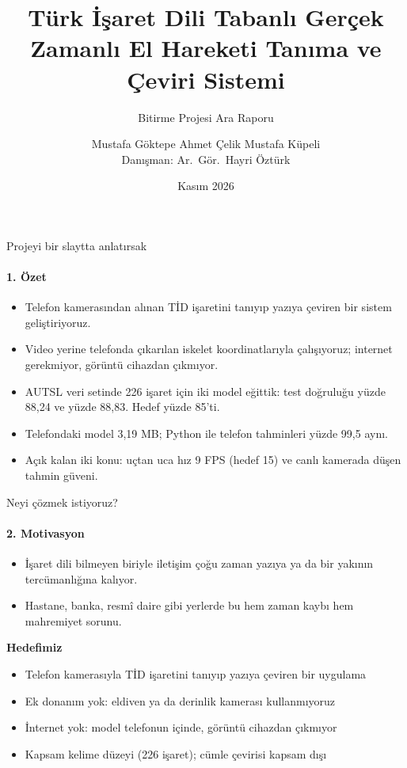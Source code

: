 \documentclass[aspectratio=169,11pt]{beamer}
\title{Türk İşaret Dili Tabanlı Gerçek Zamanlı El Hareketi Tanıma ve Çeviri Sistemi}
\subtitle{Bitirme Projesi Ara Raporu}
\author{Mustafa Göktepe \quad Ahmet Çelik \quad Mustafa Küpeli \\[1mm] {\small Danışman: Ar.\ Gör.\ Hayri Öztürk}}
\institute{Erciyes Üniversitesi, Bilgisayar Mühendisliği}
\date{Kasım 2026}
\begin{document}
\begin{frame}[plain]
\titlepage
\end{frame}

\begin{frame}{Projeyi bir slaytta anlatırsak}
\framesubtitle{1. Özet}
\begin{itemize}
\item Telefon kamerasından alınan TİD işaretini tanıyıp yazıya çeviren bir sistem geliştiriyoruz.
\item Video yerine telefonda çıkarılan iskelet koordinatlarıyla çalışıyoruz; internet gerekmiyor, görüntü cihazdan çıkmıyor.
\item AUTSL veri setinde 226 işaret için iki model eğittik: test doğruluğu yüzde 88,24 ve yüzde 88,83. Hedef yüzde 85'ti.
\item Telefondaki model 3,19 MB; Python ile telefon tahminleri yüzde 99,5 aynı.
\item Açık kalan iki konu: uçtan uca hız 9 FPS (hedef 15) ve canlı kamerada düşen tahmin güveni.
\end{itemize}
\end{frame}

\begin{frame}{Neyi çözmek istiyoruz?}
\framesubtitle{2. Motivasyon}
\begin{itemize}
\item İşaret dili bilmeyen biriyle iletişim çoğu zaman yazıya ya da bir yakının tercümanlığına kalıyor.
\item Hastane, banka, resmî daire gibi yerlerde bu hem zaman kaybı hem mahremiyet sorunu.
\end{itemize}

\vspace{4mm}
\textbf{Hedefimiz}
\begin{itemize}
\item Telefon kamerasıyla TİD işaretini tanıyıp yazıya çeviren bir uygulama
\item Ek donanım yok: eldiven ya da derinlik kamerası kullanmıyoruz
\item İnternet yok: model telefonun içinde, görüntü cihazdan çıkmıyor
\item Kapsam kelime düzeyi (226 işaret); cümle çevirisi kapsam dışı
\end{itemize}
\end{frame}
\end{document}
